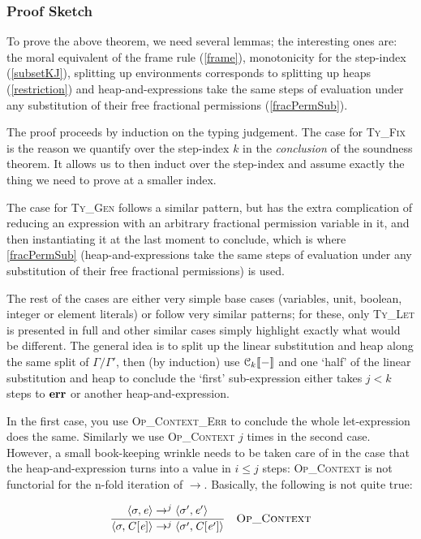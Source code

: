 \subsubsection{Proof Sketch}

To prove the above theorem, we need several lemmas; the interesting ones are:
the moral equivalent of the frame rule (\ref{frame}), monotonicity for the
step-index (\ref{subsetKJ}), splitting up environments corresponds to splitting
up heaps (\ref{restriction}) and heap-and-expressions take the same steps of
evaluation under any substitution of their free fractional permissions
(\ref{fracPermSub}).

The proof proceeds by induction on the typing judgement.  The case for
\textsc{Ty\_Fix} is the reason we quantify over the step-index $k$ in the
\emph{conclusion} of the soundness theorem. It allows us to then induct over
the step-index and assume exactly the thing we need to prove at a smaller index.

The case for \textsc{Ty\_Gen} follows a similar pattern, but has the extra
complication of reducing an expression with an arbitrary fractional permission
variable in it, and then instantiating it at the last moment to conclude,
which is where \ref{fracPermSub} (heap-and-expressions take the same steps of
evaluation under any substitution of their free fractional permissions) is
used.

The rest of the cases are either very simple base cases (variables, unit,
boolean, integer or element literals) or follow very similar patterns; for
these, only \textsc{Ty\_Let} is presented in full and other similar cases
simply highlight exactly what would be different.  The general idea is to split
up the linear substitution and heap along the same split of $\Gamma/\Gamma'$,
then (by induction) use $\mathcal{C}_{k} [\![ - ]\!]$ and one `half' of the  linear substitution
and heap to conclude the `first' sub-expression either takes $j< k$ steps to
$\mathbf{err}$ or another heap-and-expression.

In the first case, you use \textsc{Op\_Context\_Err} to conclude the whole
let-expression does the same. Similarly we use \textsc{Op\_Context} $j$ times
in the second case. However, a small book-keeping wrinkle needs to be taken
care of in the case that the heap-and-expression turns into a value in $i \leq
j$ steps: \textsc{Op\_Context} is not functorial for the n-fold iteration of
$\rightarrow$.  Basically, the following is not quite true:

\vspace{-\baselineskip}
\[
\ottdrule{%
    \ottpremise{\langle  \sigma  \ottsym{,}  \ottnt{e}  \rangle  \rightarrow^j  \langle  \sigma'  \ottsym{,}  \ottnt{e'}  \rangle}%
    }{
    \langle  \sigma  \ottsym{,}  \ottnt{C}  \ottsym{[}  \ottnt{e}  \ottsym{]}  \rangle  \rightarrow^j  \langle  \sigma'  \ottsym{,}  \ottnt{C}  \ottsym{[}  \ottnt{e'}  \ottsym{]}  \rangle}{%
    {\ottdrulename{Op\_Context}}{}%
}
\]


